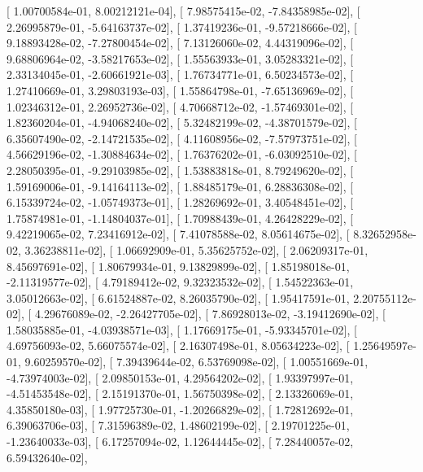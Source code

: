 \documentclass{article}
\begin{document}
       [  1.00700584e-01,   8.00212121e-04],
       [  7.98575415e-02,  -7.84358985e-02],
       [  2.26995879e-01,  -5.64163737e-02],
       [  1.37419236e-01,  -9.57218666e-02],
       [  9.18893428e-02,  -7.27800454e-02],
       [  7.13126060e-02,   4.44319096e-02],
       [  9.68806964e-02,  -3.58217653e-02],
       [  1.55563933e-01,   3.05283321e-02],
       [  2.33134045e-01,  -2.60661921e-03],
       [  1.76734771e-01,   6.50234573e-02],
       [  1.27410669e-01,   3.29803193e-03],
       [  1.55864798e-01,  -7.65136969e-02],
       [  1.02346312e-01,   2.26952736e-02],
       [  4.70668712e-02,  -1.57469301e-02],
       [  1.82360204e-01,  -4.94068240e-02],
       [  5.32482199e-02,  -4.38701579e-02],
       [  6.35607490e-02,  -2.14721535e-02],
       [  4.11608956e-02,  -7.57973751e-02],
       [  4.56629196e-02,  -1.30884634e-02],
       [  1.76376202e-01,  -6.03092510e-02],
       [  2.28050395e-01,  -9.29103985e-02],
       [  1.53883818e-01,   8.79249620e-02],
       [  1.59169006e-01,  -9.14164113e-02],
       [  1.88485179e-01,   6.28836308e-02],
       [  6.15339724e-02,  -1.05749373e-01],
       [  1.28269692e-01,   3.40548451e-02],
       [  1.75874981e-01,  -1.14804037e-01],
       [  1.70988439e-01,   4.26428229e-02],
       [  9.42219065e-02,   7.23416912e-02],
       [  7.41078588e-02,   8.05614675e-02],
       [  8.32652958e-02,   3.36238811e-02],
       [  1.06692909e-01,   5.35625752e-02],
       [  2.06209317e-01,   8.45697691e-02],
       [  1.80679934e-01,   9.13829899e-02],
       [  1.85198018e-01,  -2.11319577e-02],
       [  4.79189412e-02,   9.32323532e-02],
       [  1.54522363e-01,   3.05012663e-02],
       [  6.61524887e-02,   8.26035790e-02],
       [  1.95417591e-01,   2.20755112e-02],
       [  4.29676089e-02,  -2.26427705e-02],
       [  7.86928013e-02,  -3.19412690e-02],
       [  1.58035885e-01,  -4.03938571e-03],
       [  1.17669175e-01,  -5.93345701e-02],
       [  4.69756093e-02,   5.66075574e-02],
       [  2.16307498e-01,   8.05634223e-02],
       [  1.25649597e-01,   9.60259570e-02],
       [  7.39439644e-02,   6.53769098e-02],
       [  1.00551669e-01,  -4.73974003e-02],
       [  2.09850153e-01,   4.29564202e-02],
       [  1.93397997e-01,  -4.51453548e-02],
       [  2.15191370e-01,   1.56750398e-02],
       [  2.13326069e-01,   4.35850180e-03],
       [  1.97725730e-01,  -1.20266829e-02],
       [  1.72812692e-01,   6.39063706e-03],
       [  7.31596389e-02,   1.48602199e-02],
       [  2.19701225e-01,  -1.23640033e-03],
       [  6.17257094e-02,   1.12644445e-02],
       [  7.28440057e-02,   6.59432640e-02],
\end{document}

